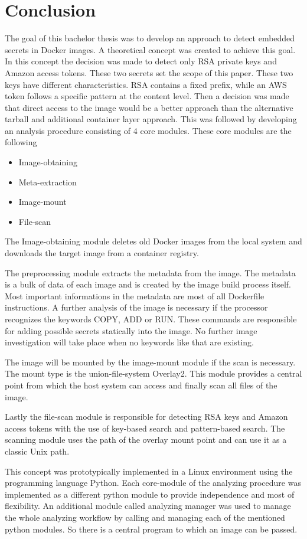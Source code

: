 \chapter{Conclusion}
\label{ch:end:conclusion}
The goal of this bachelor thesis was to develop an approach to detect embedded secrets in Docker images. 
A theoretical concept was created to achieve this goal. In this concept the decision was made to detect only RSA private keys and Amazon access tokens.
These two secrets set the scope of this paper. These two keys have different characteristics.
RSA contains a fixed prefix, while an AWS token follows a specific pattern at the content level.
Then a decision was made that direct access to the image would be a better approach than the alternative tarball and additional container layer approach.
This was followed by developing an analysis procedure consisting of 4 core modules.
These core modules are the following
\begin{itemize}
\item Image-obtaining
\item Meta-extraction
\item Image-mount
\item File-scan
\end{itemize}
The Image-obtaining module deletes old Docker images from the local system and downloads the target image from a container registry.

The preprocessing module extracts the metadata from the image. 
The metadata is a bulk of data of each image and is created by the image build process itself.
Most important informations in the metadata are most of all Dockerfile instructions.
A further analysis of the image is necessary if the processor recognizes the keywords COPY, ADD or RUN.
These commands are responsible for adding possible secrets statically into the image. 
No further image investigation will take place when no keywords like that are existing. 

The image will be mounted by the image-mount module if the scan is necessary. The mount type is the union-file-system Overlay2.
This module provides a central point from which the host system can access and finally scan all files of the image.

Lastly the file-scan module is responsible for detecting RSA keys and Amazon access tokens with the use of key-based search and pattern-based search.
The scanning module uses the path of the overlay mount point and can use it as a classic Unix path.

This concept was prototypically implemented in a Linux environment using the programming language Python.
Each core-module of the analyzing procedure was implemented as a different python module to provide independence and most of flexibility. 
An additional module called analyzing manager was used to manage the whole analyzing workflow by calling and managing each of the mentioned python modules.
So there is a central program to which an image can be passed.


